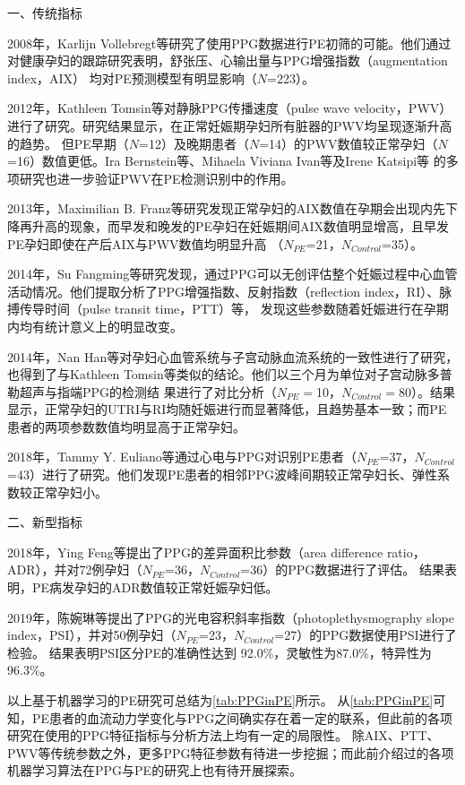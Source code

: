 一、传统指标

2008年，Karlijn Vollebregt等\cite{KARLIJN2008}研究了使用PPG数据进行PE初筛的可能。他们通过对健康孕妇的跟踪研究表明，舒张压、心输出量与PPG增强指数（augmentation index，AIX）
均对PE预测模型有明显影响（$N$=223）。

2012年，Kathleen Tomsin等\cite{Tomsin2012}对静脉PPG传播速度（pulse wave velocity，PWV）进行了研究。研究结果显示，在正常妊娠期孕妇所有脏器的PWV均呈现逐渐升高的趋势。
但PE早期（$N$=12）及晚期患者（$N$=14）的PWV数值较正常孕妇（$N$=16）数值更低。Ira Bernstein等\cite{Ira2014}、Mihaela Viviana Ivan等\cite{VivianaIvan2018}及Irene Katsipi等\cite{Katsipi2014}
的多项研究也进一步验证PWV在PE检测识别中的作用。

2013年，Maximilian B. Franz等\cite{Franz2013}研究发现正常孕妇的AIX数值在孕期会出现内先下降再升高的现象，而早发和晚发的PE孕妇在妊娠期间AIX数值明显增高，且早发PE孕妇即使在产后AIX与PWV数值均明显升高
（$N_{PE}$=21，$N_{Control}$=35）。

2014年，Su Fangming等\cite{Su2014}研究发现，通过PPG可以无创评估整个妊娠过程中心血管活动情况。他们提取分析了PPG增强指数、反射指数（reflection index，RI）、脉搏传导时间（pulse transit time，PTT）等，
发现这些参数随着妊娠进行在孕期内均有统计意义上的明显改变。

2014年，Nan Han等\cite{Han2014}对孕妇心血管系统与子宫动脉血流系统的一致性进行了研究，也得到了与Kathleen Tomsin等\cite{Tomsin2012}类似的结论。他们以三个月为单位对子宫动脉多普勒超声与指端PPG的检测结
果进行了对比分析（$N_{PE}=$10，$N_{Control}=$80）。结果显示，正常孕妇的UTRI与RI均随妊娠进行而显著降低，且趋势基本一致；而PE患者的两项参数数值均明显高于正常孕妇。

2018年，Tammy Y. Euliano等\cite{Euliano2018}通过心电与PPG对识别PE患者（$N_{PE}$=37，$N_{Control}$=43）进行了研究。他们发现PE患者的相邻PPG波峰间期较正常孕妇长、弹性系数较正常孕妇小。

二、新型指标

2018年，Ying Feng等\cite{Feng2018}提出了PPG的差异面积比参数（area difference ratio，ADR），并对72例孕妇（$N_{PE}$=36，$N_{Control}$=36）的PPG数据进行了评估。
结果表明，PE病发孕妇的ADR数值较正常妊娠孕妇低。

2019年，陈婉琳等\cite{Chen2019}提出了PPG的光电容积斜率指数（photoplethysmography slope index，PSI），并对50例孕妇（$N_{PE}$=23，$N_{Control}$=27）的PPG数据使用PSI进行了检验。
结果表明PSI区分PE的准确性达到 92.0\%，灵敏性为87.0\%，特异性为96.3\%。

以上基于机器学习的PE研究可总结为\autoref{tab:PPGinPE}所示。
从\autoref{tab:PPGinPE}可知，PE患者的血流动力学变化与PPG之间确实存在着一定的联系，但此前的各项研究在使用的PPG特征指标与分析方法上均有一定的局限性。
除AIX、PTT、PWV等传统参数之外，更多PPG特征参数有待进一步挖掘；而此前介绍过的各项机器学习算法在PPG与PE的研究上也有待开展探索。


